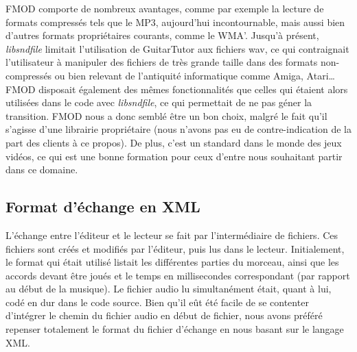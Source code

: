 FMOD comporte de nombreux avantages, comme par exemple la lecture de formats compressés tels que le MP3, aujourd'hui incontournable, mais aussi bien d'autres formats propriétaires courants, comme le WMA'.
Jusqu'à présent, \textit{libsndfile} limitait l'utilisation de GuitarTutor aux fichiers wav, ce qui contraignait l'utilisateur à manipuler des fichiers de très grande taille dans des formats non-compressés ou bien relevant de l'antiquité informatique comme Amiga, Atari\dots FMOD disposait également des mêmes fonctionnalités que celles qui étaient alors utilisées dans le code avec \textit{libsndfile}, ce qui permettait de ne pas géner la transition. FMOD nous a donc semblé être un bon choix, malgré le fait qu'il s'agisse d'une librairie propriétaire (nous n'avons pas eu de contre-indication de la part des clients à ce propos).
De plus, c'est un standard dans le monde des jeux vidéos, ce qui est une bonne formation pour ceux d'entre nous souhaitant partir dans ce domaine.


\subsection{Format d'échange en XML}
\label{xml}

L'échange entre l'éditeur et le lecteur se fait par l'intermédiaire de fichiers. Ces fichiers sont créés et modifiés par l'éditeur, puis lus dans le lecteur. Initialement, le format qui était utilisé listait les différentes parties du morceau, ainsi que les accords devant être joués et le temps en millisecondes correspondant (par rapport au début de la musique). Le fichier audio lu simultanément était, quant à lui, codé en dur dans le code source. Bien qu'il eût été facile de se contenter d'intégrer le chemin du fichier audio en début de fichier, nous avons préféré repenser totalement le format du fichier d'échange en nous basant sur le langage XML.

